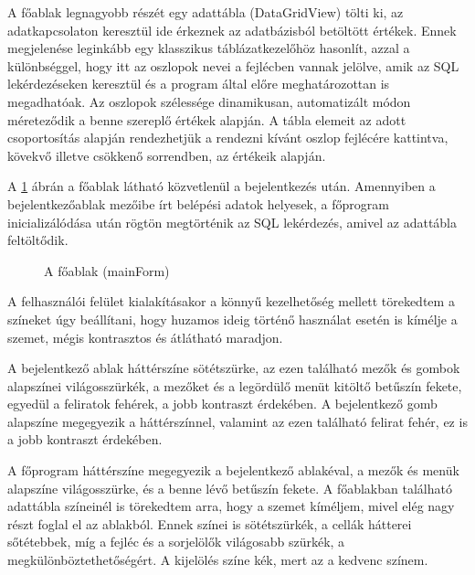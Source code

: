 A főablak legnagyobb részét egy adattábla (DataGridView) tölti ki, az adatkapcsolaton keresztül ide érkeznek az adatbázisból betöltött értékek. Ennek megjelenése leginkább egy klasszikus táblázatkezelőhöz hasonlít, azzal a különbséggel, hogy itt az oszlopok nevei a fejlécben vannak jelölve, amik az SQL lekérdezéseken keresztül és a program által előre meghatározottan is megadhatóak. Az oszlopok szélessége dinamikusan, automatizált módon méreteződik a benne szereplő értékek alapján. A tábla elemeit az adott csoportosítás alapján rendezhetjük a rendezni kívánt oszlop fejlécére kattintva, kövekvő illetve csökkenő sorrendben, az értékeik alapján.\par
\setlength{\parindent}{12.5mm}A \ref{fig:mainForm_afterLogin} ábrán a főablak látható közvetlenül a bejelentkezés után. Amennyiben a bejelentkezőablak mezőibe írt belépési adatok helyesek, a főprogram inicializálódása után rögtön megtörténik az SQL lekérdezés, amivel az adattábla feltöltődik.


\begin{figure}[ht]
\centering
{}
\caption{A főablak (mainForm)} 
\label{fig:mainForm_afterLogin}
\end{figure}

\newpage


A felhasználói felület kialakításakor a könnyű kezelhetőség mellett törekedtem a színeket úgy beállítani, hogy huzamos ideig történő használat esetén is kímélje a szemet, mégis kontrasztos és átlátható maradjon.\par
\setlength{\parindent}{12.5mm}A bejelentkező ablak háttérszíne sötétszürke, az ezen található mezők és gombok alapszínei világosszürkék, a mezőket és a legördülő menüt kitöltő betűszín fekete, egyedül a feliratok fehérek, a jobb kontraszt érdekében. A bejelentkező gomb alapszíne megegyezik a háttérszínnel, valamint az ezen található felirat fehér, ez is a jobb kontraszt érdekében.\par
\setlength{\parindent}{12.5mm}A főprogram háttérszíne megegyezik a bejelentkező ablakéval, a mezők és menük alapszíne világosszürke, és a benne lévő betűszín fekete. A főablakban található adattábla színeinél is törekedtem arra, hogy a szemet kíméljem, mivel elég nagy részt foglal el az ablakból. Ennek színei is sötétszürkék, a cellák hátterei sőtétebbek, míg a fejléc és a sorjelölők világosabb szürkék, a megkülönböztethetőségért. A kijelölés színe kék, mert az a kedvenc színem.






